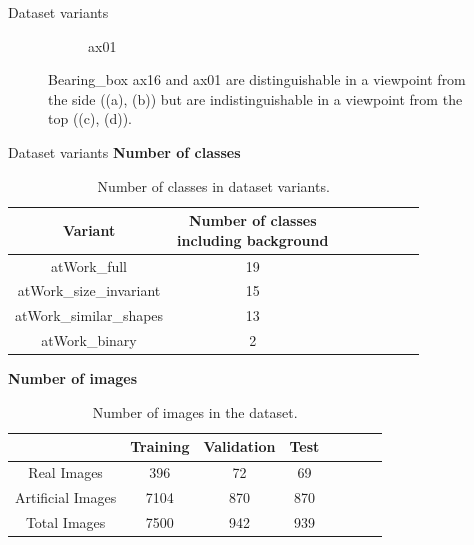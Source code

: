 \documentclass{beamer}
\begin{document}
\begin{frame}{Dataset variants}
\begin{small}
\begin{itemize}
\begin{figure}
\begin{subfigure}{.21\textwidth}
  					\caption{ax01}
  					\label{Fig:sim2b}
				\end{subfigure}%
				\caption{Bearing\_box ax16 and ax01 are distinguishable in a viewpoint from the side ((a), (b)) but are indistinguishable in a viewpoint from the top ((c), (d)).}
				\label{Fig:shape}
			\end{figure}
		\end{itemize}
			
	\end{small}

\end{frame}


\begin{frame}{Dataset variants}
	\textbf{Number of classes}
	\begin{small}
		\begin{table}
			\centering
			\begin{tabular}{|c|c|c|c|c|c|c|c|}
			\hline 
    		Variant & \makecell{Number of classes \\ including background} \\ 
			\hline 
			atWork\_full & 19 \\ 
			\hline 
			atWork\_size\_invariant & 15 \\ 
			\hline 
			atWork\_similar\_shapes & 13 \\ 
			\hline 
			atWork\_binary & 2 \\ 
			\hline 
			\end{tabular}
			\caption{Number of classes in dataset variants.}
			\label{Table:meta}
		\end{table}
	\end{small}
		
	\textbf{Number of images}
	\begin{small}	
		\begin{table}
			\centering
			\begin{tabular}{|c|c|c|c|c|c|c|c|}
			\hline 
    		& Training & Validation & Test \\ 
			\hline 
			Real Images & 396 & 72 & 69 \\ 
			\hline 
			Artificial Images & 7104 & 870 & 870 \\ 
			\hline 
			Total Images & 7500 & 942 & 939 \\ 
			\hline 
			\end{tabular}
			\caption{Number of images in the dataset.}
			\label{Table:meta}
		\end{table}
	\end{small}

\end{frame}
\end{document}
